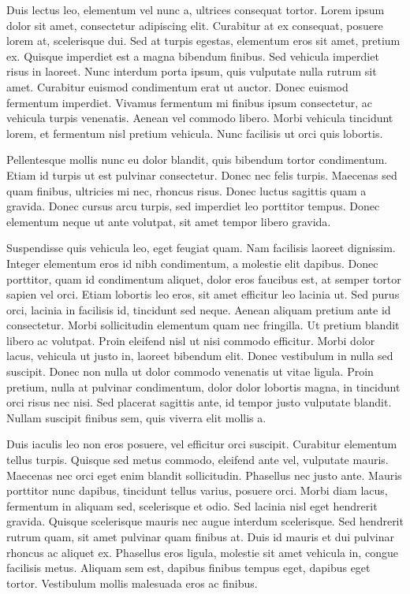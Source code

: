 Duis lectus leo, elementum vel nunc a, ultrices consequat tortor. Lorem ipsum dolor sit amet, consectetur adipiscing elit. Curabitur at ex consequat, posuere lorem at, scelerisque dui. Sed at turpis egestas, elementum eros sit amet, pretium ex. Quisque imperdiet est a magna bibendum finibus. Sed vehicula imperdiet risus in laoreet. Nunc interdum porta ipsum, quis vulputate nulla rutrum sit amet. Curabitur euismod condimentum erat ut auctor. Donec euismod fermentum imperdiet. Vivamus fermentum mi finibus ipsum consectetur, ac vehicula turpis venenatis. Aenean vel commodo libero. Morbi vehicula tincidunt lorem, et fermentum nisl pretium vehicula. Nunc facilisis ut orci quis lobortis.

Pellentesque mollis nunc eu dolor blandit, quis bibendum tortor condimentum. Etiam id turpis ut est pulvinar consectetur. Donec nec felis turpis. Maecenas sed quam finibus, ultricies mi nec, rhoncus risus. Donec luctus sagittis quam a gravida. Donec cursus arcu turpis, sed imperdiet leo porttitor tempus. Donec elementum neque ut ante volutpat, sit amet tempor libero gravida.

Suspendisse quis vehicula leo, eget feugiat quam. Nam facilisis laoreet dignissim. Integer elementum eros id nibh condimentum, a molestie elit dapibus. Donec porttitor, quam id condimentum aliquet, dolor eros faucibus est, at semper tortor sapien vel orci. Etiam lobortis leo eros, sit amet efficitur leo lacinia ut. Sed purus orci, lacinia in facilisis id, tincidunt sed neque. Aenean aliquam pretium ante id consectetur. Morbi sollicitudin elementum quam nec fringilla. Ut pretium blandit libero ac volutpat. Proin eleifend nisl ut nisi commodo efficitur. Morbi dolor lacus, vehicula ut justo in, laoreet bibendum elit. Donec vestibulum in nulla sed suscipit. Donec non nulla ut dolor commodo venenatis ut vitae ligula. Proin pretium, nulla at pulvinar condimentum, dolor dolor lobortis magna, in tincidunt orci risus nec nisi. Sed placerat sagittis ante, id tempor justo vulputate blandit. Nullam suscipit finibus sem, quis viverra elit mollis a.

Duis iaculis leo non eros posuere, vel efficitur orci suscipit. Curabitur elementum tellus turpis. Quisque sed metus commodo, eleifend ante vel, vulputate mauris. Maecenas nec orci eget enim blandit sollicitudin. Phasellus nec justo ante. Mauris porttitor nunc dapibus, tincidunt tellus varius, posuere orci. Morbi diam lacus, fermentum in aliquam sed, scelerisque et odio. Sed lacinia nisl eget hendrerit gravida. Quisque scelerisque mauris nec augue interdum scelerisque. Sed hendrerit rutrum quam, sit amet pulvinar quam finibus at. Duis id mauris et dui pulvinar rhoncus ac aliquet ex. Phasellus eros ligula, molestie sit amet vehicula in, congue facilisis metus. Aliquam sem est, dapibus finibus tempus eget, dapibus eget tortor. Vestibulum mollis malesuada eros ac finibus.

